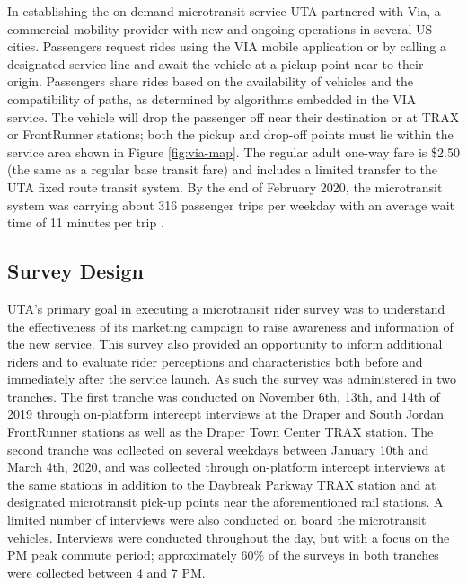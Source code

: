 \documentclass[smartcities,article,submit,moreauthors,pdftex]{Definitions/mdpi}
\begin{document}
In establishing the on-demand microtransit service UTA partnered with Via, a commercial mobility provider with new and ongoing operations in several US cities. Passengers request rides using the VIA mobile application or by calling a designated service line and await the vehicle at a pickup point near to their origin. Passengers share rides based on the availability of vehicles and the compatibility of paths, as determined by algorithms embedded in the VIA service. The vehicle will drop the passenger off near their destination or at TRAX or FrontRunner stations; both the pickup and drop-off points must lie within the service area shown in Figure \ref{fig:via-map}. The regular adult one-way fare is \$2.50 (the same as a regular base transit fare) and includes a limited transfer to the UTA fixed route transit system. By the end of February 2020, the microtransit system was carrying about 316 passenger trips per weekday with an average wait time of 11 minutes per trip \citep{uta2020}.



\subsection{Survey Design}
UTA’s primary goal in executing a microtransit rider survey was to understand the effectiveness of its marketing campaign to raise awareness and information of the new service. This survey also provided an opportunity to inform additional riders and to evaluate rider perceptions and characteristics both before and immediately after the service launch. As such the survey was administered in two tranches. The first tranche was conducted on November 6th, 13th, and 14th of 2019 through on-platform intercept interviews at the Draper and South Jordan FrontRunner stations as well as the Draper Town Center TRAX station. The second tranche was collected on several weekdays between January 10th and March 4th, 2020, and was collected through on-platform intercept interviews at the same stations in addition to the Daybreak Parkway TRAX station and at designated microtransit pick-up points near the aforementioned rail stations. A limited number of interviews were also conducted on board the microtransit vehicles. Interviews were conducted throughout the day, but with a focus on the PM peak commute period; approximately 60\% of the surveys in both tranches were collected between 4 and 7 PM.
\end{document}
